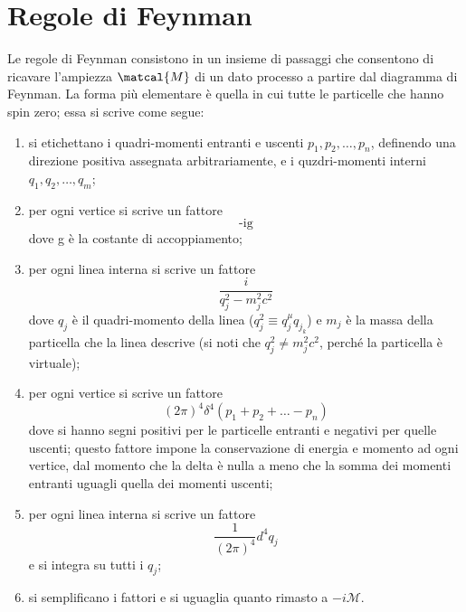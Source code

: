 \documentclass{subnucbo}
\begin{document}
\section{Regole di Feynman}
\label{app:feynman_rules}
Le regole di Feynman consistono in un insieme di passaggi che consentono di ricavare l'ampiezza $\matcal{M}$ di un dato processo a partire dal diagramma di Feynman. La forma più elementare è quella in cui tutte le particelle che hanno spin zero; essa si scrive come segue:
\begin{enumerate}
        \item si etichettano i quadri-momenti entranti e uscenti $p_{1}, p_{2}, \ldots, p_{n}$, definendo una direzione positiva assegnata arbitrariamente, e i quzdri-momenti interni $q_{1}, q_{2}, \ldots, q_{m}$;
        \item per ogni vertice si scrive un fattore
                \begin{equation}
                        \text { -ig }
                \end{equation}
                dove g è la costante di accoppiamento;
        \item per ogni linea interna si scrive un fattore
                \begin{equation}
                        \frac { i } { q _ { j } ^ { 2 } - m _ { j } ^ { 2 } c ^ { 2 } }
                \end{equation}
                dove $q_{j}$ è il quadri-momento della linea ($q _ { j } ^ { 2 } \equiv q _ { j } ^ { \mu } q _ { j _ { k } }$) e $m_{j}$ è la massa della particella che la linea descrive (si noti che $q _ { j } ^ { 2 } \neq m _ { j } ^ { 2 } c ^ { 2 }$, perché la particella è virtuale);
        \item per ogni vertice si scrive un fattore
                \begin{equation}
                        ( 2 \pi ) ^ { 4 } \delta ^ { 4 } \left( p _ { 1 } + p _ { 2 } + \ldots - p _ { n } \right)
                \end{equation}
                dove si hanno segni positivi per le particelle entranti e negativi per quelle uscenti; questo fattore impone la conservazione di energia e momento ad ogni vertice, dal momento che la delta è nulla a meno che la somma dei momenti entranti uguagli quella dei momenti uscenti;
        \item per ogni linea interna si scrive un fattore \begin{equation}
                        \frac { 1 } { ( 2 \pi ) ^ { 4 } } d ^ { 4 } q _ { j }
                \end{equation}
                e si integra su tutti i $q_{j}$;
        \item si semplificano i fattori e si uguaglia quanto rimasto a $-i\mathcal{M}$.
\end{enumerate}
\end{document}
